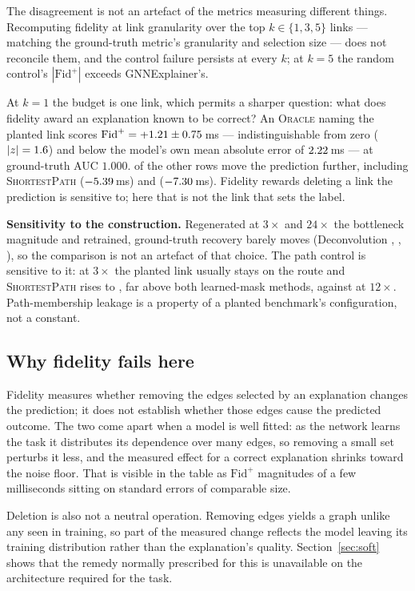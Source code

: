\documentclass[conference]{IEEEtran}
\begin{document}
The disagreement is not an artefact of the metrics measuring different
things. Recomputing fidelity at link granularity over the
top $k\!\in\!\{1,3,5\}$ links --- matching the ground-truth metric's
granularity and selection size --- does not reconcile them, and the control
failure persists at every $k$; at $k=5$ the random control's
$|\mathrm{Fid}^{+}|$ exceeds GNNExplainer's.

At $k=1$ the budget is one link, which permits a sharper question: what does
fidelity award an explanation known to be correct? An \textsc{Oracle} naming
the planted link scores $\mathrm{Fid}^{+}=+1.21 \pm
0.75$\,ms --- indistinguishable from zero ($|z|=1.6$) and
below the model's own mean absolute error of $2.22$\,ms --- at
ground-truth AUC $1.000$. \KoneNBigger{} of the \KoneNOther{} other rows move
the prediction further, including \textsc{ShortestPath} ($-5.39$\,ms)
and \KoneWorstName{} ($-7.30$\,ms). Fidelity rewards deleting a link
the prediction is sensitive to; here that is not the link that sets the label.

\textbf{Sensitivity to the construction.} Regenerated at $3\times$ and
$24\times$ the bottleneck magnitude and retrained, ground-truth recovery barely
moves (Deconvolution \MagThreeDeconv, \MagTwelveDeconv, \MagTwentyFourDeconv),
so the comparison is not an artefact of that choice. The path control is
sensitive to it: at $3\times$ the planted link usually stays on the route and
\textsc{ShortestPath} rises to \MagThreeShortPath, far above both learned-mask
methods, against \GTShortPath{} at $12\times$. Path-membership leakage is a
property of a planted benchmark's configuration, not a constant.

\subsection{Why fidelity fails here}
Fidelity measures whether removing the edges selected by an explanation changes the prediction; it does not establish whether those edges cause the predicted outcome. The two come apart when a model is well fitted: as the network
learns the task it distributes its dependence over many edges, so removing a
small set perturbs it less, and the measured effect for a correct explanation
shrinks toward the noise floor. That is visible in the table as
$\mathrm{Fid}^{+}$ magnitudes of a few milliseconds sitting on standard errors
of comparable size.

Deletion is also not a neutral operation. Removing edges yields a graph unlike
any seen in training, so part of the measured change reflects the model
leaving its training distribution rather than the explanation's quality.
Section~\ref{sec:soft} shows that the remedy normally prescribed for this is
unavailable on the architecture required for the task.
\end{document}
